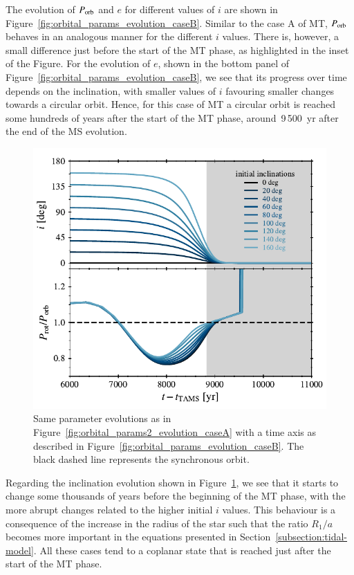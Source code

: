 \documentclass{aa}
\begin{document}
The evolution of $P_{\rm orb}$ and $e$ for different values of $i$ are shown in Figure~\ref{fig:orbital_params_evolution_caseB}. Similar to
the case A of MT, $P_{\rm orb}$ behaves in an analogous manner for the different $i$ values. There is, however, a small difference just
before the start of the MT phase, as highlighted in the inset of the Figure. For the evolution of $e$, shown in the bottom panel of
Figure~\ref{fig:orbital_params_evolution_caseB}, we see that its progress over time depends on the inclination, with smaller values of $i$
favouring smaller changes towards a circular orbit. Hence, for this case of MT a circular orbit is reached some hundreds of years after the
start of the MT phase, around~9\,500~yr after the end of the MS evolution.

\begin{figure}
   \centering
   \includegraphics[width=\hsize]{figures/orbital_params2_evolution_caseB.pdf}
   \caption{Same parameter evolutions as in Figure~\ref{fig:orbital_params2_evolution_caseA} with a time axis as described in
      Figure~\ref{fig:orbital_params_evolution_caseB}. The black dashed line represents the synchronous orbit.}
   \label{fig:orbital_params2_evolution_caseB}
\end{figure}

Regarding the inclination evolution shown in Figure~\ref{fig:orbital_params2_evolution_caseB}, we see that it starts to change some
thousands of years before the beginning of the MT phase, with the more abrupt changes related to the higher initial $i$ values. This
behaviour is a consequence of the increase in the radius of the star such that the ratio $R_1 / a$ becomes more important in the equations
presented in Section~\ref{subsection:tidal-model}. All these cases tend to a coplanar state that is reached just after the start of the MT
phase.
\end{document}
